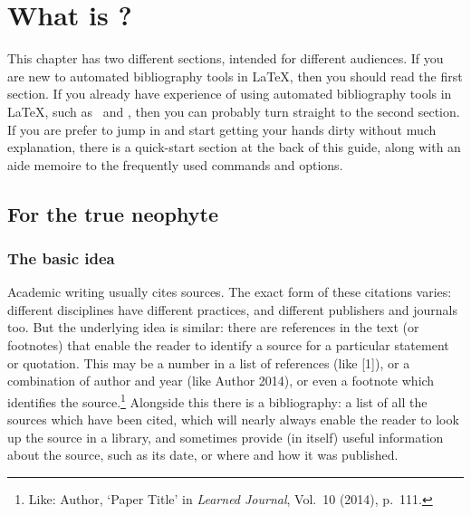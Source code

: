 
\chapter{What is ?}\label{ch:introduction}

This chapter has two different sections, intended for different
audiences. If you are new to automated bibliography tools in \LaTeX,
then you should read the first section. If
you already have experience of using automated bibliography tools in
\LaTeX, such as \bibtex\ and , then you can probably
turn straight to the second section. If you
are prefer to jump in and start getting your hands dirty without much
explanation, there is a quick-start section at the back of this
guide, along with an aide memoire to
the frequently used commands and
options.

\section{For the true neophyte}

\subsection{The basic idea}
\label{newbie}

Academic writing usually cites sources. The exact form of these
citations varies: different disciplines have different practices, and
different publishers and journals too. But the underlying idea is
similar: there are references in the text (or footnotes) that enable
the reader to identify a source for a particular statement or
quotation. This may be a number in a list of references (like [1]),
or a combination of author and year (like Author 2014), or even a
footnote which identifies the source.\footnote{Like: Author, `Paper
  Title' in \emph{Learned Journal}, Vol.\ 10 (2014), p.\ 111.}
Alongside this there is a bibliography: a list of all the sources
which have been cited, which will nearly always enable the reader to
look up the source in a library, and sometimes provide (in itself)
useful information about the source, such as its date, or where
and how it was published.

